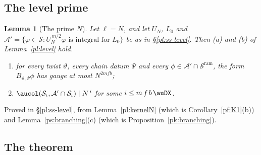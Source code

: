 \documentclass[10pt]{amsart}
\newtheorem{lemma}[theorem]{Lemma}
\theoremstyle{definition}
\theoremstyle{remark}
\providecommand{\auS}{\mathcal S}
\providecommand{\auSram}{\mathcal S^{\mathrm{ram}}}
\begin{document}
\subsection*{The level prime}
\begin{lemma}[The prime $N$]\label{pa:level}
Let $\ell=N$, and let $U_N$, $L_0$ and $\mathcal A'=\{\varphi\in\auS:U_N^{\,m/2}\varphi\text{ is
integral for }L_0\}$ be as in \S\ref{pl:ss-level}. Then {\rm(a)} and {\rm(b)} of Lemma~\ref{pl:level}
hold.
\begin{enumerate}
\item[(a)] for every twist $\vartheta$, every chain datum $\Psi$ and every
$\phi\in\mathcal A'\cap\auSram$, the form $B_{\vartheta,\Psi}\phi$ has gauge at most $N^{2mfb}$;
\item[(b)] $\aucol(\auS_\iota,\mathcal A'\cap\auS_\iota)\mid N^{\,i}$ for some
$i\le m\,f\,b\,\auDX$.
\end{enumerate}
\end{lemma}
\noindent Proved in \S\ref{pl:ss-level}, from Lemma~\ref{pl:kernelN} (which is
Corollary~\ref{pf:K1}(b)) and Lemma~\ref{ps:branching}(c) (which is Proposition~\ref{pk:branching}).

\subsection*{The theorem}
\end{document}
